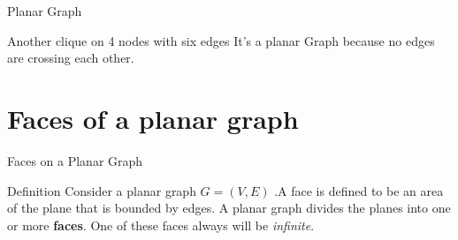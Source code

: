 \documentclass{beamer}
\begin{document}
\begin{frame}{Planar Graph}
\begin{center}
\end{center}
 Another clique on 4 nodes with six edges \newline
It's a planar Graph because no edges are crossing each other.
\newline
\end{frame}

\section{Faces of a planar graph}
\begin{frame}{Faces on a Planar Graph}
        \begin{block}{Definition}
       Consider a planar graph $G=(V,E)$ .A face is defined to be an area of the plane that is bounded by edges. A planar graph divides the planes into one or more \textbf{faces}. One of these faces always will be \emph{infinite}.
        \end{block}
\end{frame}
\end{document}
